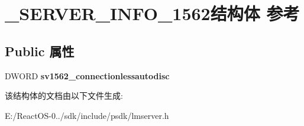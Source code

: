 \hypertarget{struct___s_e_r_v_e_r___i_n_f_o__1562}{}\section{\+\_\+\+S\+E\+R\+V\+E\+R\+\_\+\+I\+N\+F\+O\+\_\+1562结构体 参考}
\label{struct___s_e_r_v_e_r___i_n_f_o__1562}
\subsection*{Public 属性}
\begin{DoxyCompactItemize}
\item 
\mbox{\label{struct___s_e_r_v_e_r___i_n_f_o__1562_ae9a309c24a898a9bb754e219e847d6d7}} 
D\+W\+O\+RD {\bfseries sv1562\+\_\+connectionlessautodisc}
\end{DoxyCompactItemize}


该结构体的文档由以下文件生成\+:\begin{DoxyCompactItemize}
\item 
E\+:/\+React\+O\+S-\/0../sdk/include/psdk/lmserver.\+h\end{DoxyCompactItemize}
